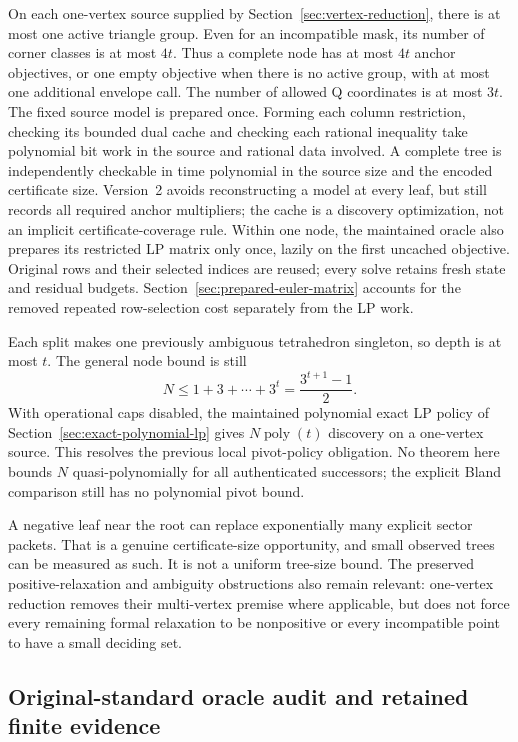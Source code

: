 On each one-vertex source supplied by
Section~\ref{sec:vertex-reduction}, there is at most one active triangle
group.  Even for an incompatible mask, its number of corner classes is at
most $4t$.  Thus a complete node has at most $4t$ anchor objectives, or one
empty objective when there is no active group, with at most one additional
envelope call.  The number of allowed Q coordinates is at most $3t$.
The fixed source model is prepared once.  Forming each column restriction,
checking its bounded dual cache and checking each rational inequality take
polynomial bit work in the source and rational data involved.  A complete
tree is independently checkable in time polynomial in the source size and
the encoded certificate size.  Version~2 avoids reconstructing a model at
every leaf, but still records all required anchor multipliers; the cache is
a discovery optimization, not an implicit certificate-coverage rule.
Within one node, the maintained oracle also prepares its restricted LP
matrix only once, lazily on the first uncached objective.  Original rows
and their selected indices are reused; every solve retains fresh state
and residual budgets.  Section~\ref{sec:prepared-euler-matrix} accounts
for the removed repeated row-selection cost separately from the LP work.

Each split makes one previously ambiguous tetrahedron singleton, so depth
is at most $t$.  The general node bound is still
\[
 N\le 1+3+\cdots+3^t=\frac{3^{t+1}-1}{2}.
\]
With operational caps disabled, the maintained polynomial exact LP policy
of Section~\ref{sec:exact-polynomial-lp} gives
$N\operatorname{poly}(t)$ discovery on a one-vertex source.  This resolves
the previous local pivot-policy obligation.  No theorem here bounds $N$
quasi-polynomially for all authenticated successors; the explicit Bland
comparison still has no polynomial pivot bound.

A negative leaf near the root can replace exponentially many explicit
sector packets.  That is a genuine certificate-size opportunity, and small
observed trees can be measured as such.  It is not a uniform tree-size
bound.  The preserved positive-relaxation and ambiguity obstructions also
remain relevant: one-vertex reduction removes their multi-vertex premise
where applicable, but does not force every remaining formal relaxation to
be nonpositive or every incompatible point to have a small deciding set.

\subsection{Original-standard oracle audit and retained finite evidence}

